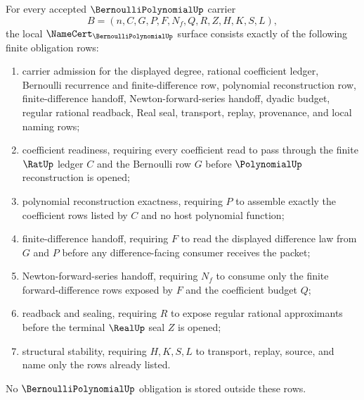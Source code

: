 \begin{theorem}
\label{thm:bernoulli-polynomial-namecert-obligations}
For every accepted $\BernoulliPolynomialUp$ carrier
$$
B=(n,C,G,P,F,N_f,Q,R,Z,H,K,S,L),
$$
the local $\NameCert_{\BernoulliPolynomialUp}$ surface consists exactly of the following finite obligation rows:
\begin{enumerate}
\item carrier admission for the displayed degree, rational coefficient ledger, Bernoulli recurrence and finite-difference row, polynomial reconstruction row, finite-difference handoff, Newton-forward-series handoff, dyadic budget, regular rational readback, Real seal, transport, replay, provenance, and local naming rows;
\item coefficient readiness, requiring every coefficient read to pass through the finite $\RatUp$ ledger $C$ and the Bernoulli row $G$ before $\PolynomialUp$ reconstruction is opened;
\item polynomial reconstruction exactness, requiring $P$ to assemble exactly the coefficient rows listed by $C$ and no host polynomial function;
\item finite-difference handoff, requiring $F$ to read the displayed difference law from $G$ and $P$ before any difference-facing consumer receives the packet;
\item Newton-forward-series handoff, requiring $N_f$ to consume only the finite forward-difference rows exposed by $F$ and the coefficient budget $Q$;
\item readback and sealing, requiring $R$ to expose regular rational approximants before the terminal $\RealUp$ seal $Z$ is opened;
\item structural stability, requiring $H,K,S,L$ to transport, replay, source, and name only the rows already listed.
\end{enumerate}
No $\BernoulliPolynomialUp$ obligation is stored outside these rows.
\end{theorem}
